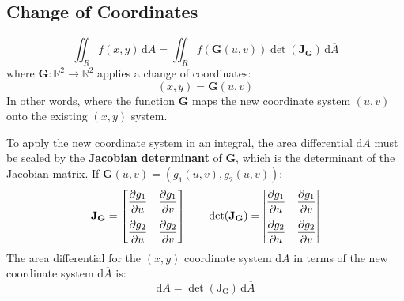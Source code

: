 \documentclass{article}
\begin{document}
\subsection{Change of Coordinates}

\begin{equation*}
    \iint_R f(x,y) \,\mathrm{d}A
	=\iint_R f(\mathbf G(u,v)) \det(\mathbf J_\mathbf G) \,\mathrm{d}\overline A
\end{equation*}
where $\mathbf G:\mathbb R^2\to\mathbb R^2$ applies a change of coordinates:
\begin{equation*}
	(x,y)=\mathbf G(u,v)
\end{equation*}
In other words, where the function $\mathbf G$ maps the new coordinate system $(u,v)$ onto the existing $(x,y)$ system.

To apply the new coordinate system in an integral, the area differential $\mathrm{d}A$ must be scaled by the \textbf{Jacobian determinant} of $\mathbf G$, which is the determinant of the Jacobian matrix. If $\mathbf G(u,v)=(g_1(u,v), g_2(u,v))$:
\begin{equation*}
    \mathbf J_\mathbf G
	=\left[\begin{matrix}
		\displaystyle \diffp{g_1}{u} &
		\displaystyle \diffp{g_1}{v} \\[10pt]
		\displaystyle \diffp{g_2}{u} &
		\displaystyle \diffp{g_2}{v}
	\end{matrix}\right]
	\qquad
    \det(\mathbf J_\mathbf G)
	=\left|\begin{matrix}
		\displaystyle \diffp{g_1}{u} &
		\displaystyle \diffp{g_1}{v} \\[10pt]
		\displaystyle \diffp{g_2}{u} &
		\displaystyle \diffp{g_2}{v}
	\end{matrix}\right|
\end{equation*}
The area differential for the $(x,y)$ coordinate system $\mathrm{d}A$ in terms of the new coordinate system $\mathrm{d}\overline A$ is:
\begin{equation*}
	\mathrm{d}A 
	=\det(\mathrm J_\mathrm G) \,\mathrm{d}\overline A
\end{equation*}
\end{document}
